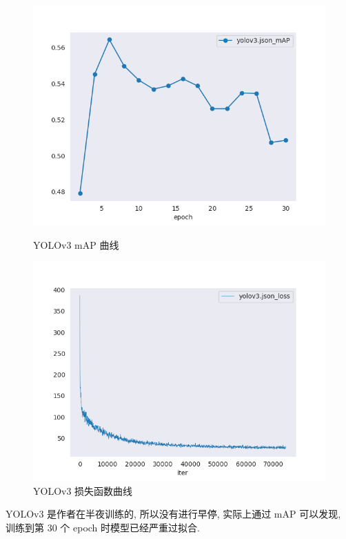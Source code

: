 \documentclass[notitlepage,cs4size,punct,oneside]{ctexrep}
\numberwithin{equation}{chapter}
\theoremstyle{mystyle}
\begin{document}
\begin{figure}[!htpb]
    \centering
    \begin{minipage}[t]{0.49\textwidth}
    \includegraphics[width=\linewidth]{yolov3_mAP.png}
    \caption{YOLOv3 mAP 曲线}
    \label{mAPfrcnn}
    \end{minipage}
    \begin{minipage}[t]{0.49\textwidth}
    \includegraphics[width=\linewidth]{yolov3_loss.png}
    \caption{YOLOv3 损失函数曲线}
    \label{frcnn_loss}
    \end{minipage}
\end{figure}

YOLOv3 是作者在半夜训练的, 所以没有进行早停, 实际上通过 mAP 可以发现, 训练到第 30 个 epoch 时模型已经严重过拟合.
\end{document}
